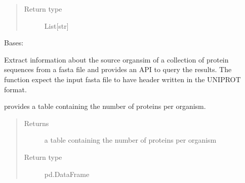 \documentclass[letterpaper,10pt,english]{sphinxmanual}
\begin{document}
\begin{fulllineitems}
\begin{fulllineitems}
\begin{quote}
\begin{description}
\item[{Return type}] \leavevmode
List{[}str{]}

\end{description}\end{quote}

\end{fulllineitems}


\end{fulllineitems}


\begin{fulllineitems}
\label{\detokenize{IPTK.Classes:IPTK.Classes.Database.OrganismDB}}
Bases: 

Extract information about the source organsim of a collection of protein sequences 
from a fasta file and provides an API to query the results.     The function expect the input fasta file to have header written in the UNIPROT format.

\begin{fulllineitems}
\label{\detokenize{IPTK.Classes:IPTK.Classes.Database.OrganismDB.get_number_protein_per_organism}}
provides a table containing the number of proteins per organism.
\begin{quote}\begin{description}
\item[{Returns}] \leavevmode
a table containing the number of proteins per organism

\item[{Return type}] \leavevmode
pd.DataFrame

\end{description}\end{quote}

\end{fulllineitems}



\end{fulllineitems}
\end{document}
